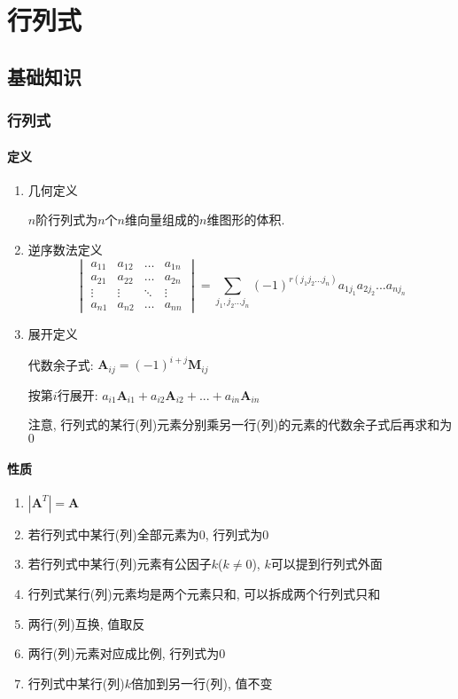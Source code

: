 \chapter{行列式}
\section{基础知识}
\subsection{行列式}
\subsubsection{定义}
\begin{enumerate}
\item 几何定义\par $ n $阶行列式为$ n $个$ n $维向量组成的$ n $维图形的体积.
\item 逆序数法定义
\begin{equation*}
\begin{vmatrix}
a_{11}	&a_{12}  &\dots  &a_{1n}  \\
a_{21}	&a_{22}  &\dots  &a_{2n}  \\
\vdots	&\vdots  &\ddots  &\vdots  \\
a_{n1}	&a_{n2}  &\dots  &a_{nn}  
\end{vmatrix}  = \sum_{j_{1},j_{2}...j_{n}}(-1)^{r(j_{1}j_{2}...j_{n})}a_{1j_{1}}a_{2j_{2}}...a_{nj_{n}}
\end{equation*}
\item 展开定义\par 代数余子式: $ \bm{A}_{ij}=(-1)^{i+j}\bm{M}_{ij} $\par 按第$ i $行展开: $ a_{i1}\bm{A}_{i1}+a_{i2}\bm{A}_{i2}+...+a_{in}\bm{A}_{in} $\par 注意, 行列式的某行(列)元素分别乘另一行(列)的元素的代数余子式后再求和为$ 0 $
\end{enumerate}
\subsubsection{性质}
\begin{enumerate}
\item $ |\bm{A}^{T}|=\bm{A} $
\item 若行列式中某行(列)全部元素为$ 0 $, 行列式为$ 0 $
\item 若行列式中某行(列)元素有公因子$ k $($ k\neq 0 $), $ k $可以提到行列式外面
\item 行列式某行(列)元素均是两个元素只和, 可以拆成两个行列式只和
\item 两行(列)互换, 值取反
\item 两行(列)元素对应成比例, 行列式为$ 0 $
\item 行列式中某行(列)$ k $倍加到另一行(列), 值不变
\end{enumerate}
